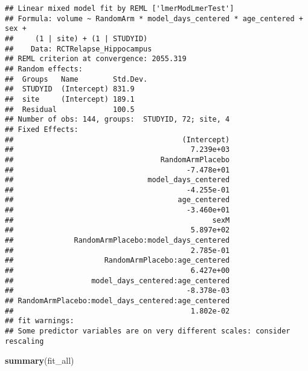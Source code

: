 \documentclass[]{article}
\newenvironment{Shaded}{\begin{snugshade}}{\end{snugshade}}
\newcommand{\KeywordTok}[1]{\textcolor[rgb]{0.13,0.29,0.53}{\textbf{#1}}}
\newcommand{\NormalTok}[1]{#1}
\theoremstyle{definition}
\theoremstyle{definition}
\theoremstyle{definition}
\theoremstyle{remark}
\begin{document}
\begin{verbatim}
## Linear mixed model fit by REML ['lmerModLmerTest']
## Formula: volume ~ RandomArm * model_days_centered * age_centered + sex +  
##     (1 | site) + (1 | STUDYID)
##    Data: RCTRelapse_Hippocampus
## REML criterion at convergence: 2055.319
## Random effects:
##  Groups   Name        Std.Dev.
##  STUDYID  (Intercept) 831.9   
##  site     (Intercept) 189.1   
##  Residual             100.5   
## Number of obs: 144, groups:  STUDYID, 72; site, 4
## Fixed Effects:
##                                       (Intercept)  
##                                         7.239e+03  
##                                  RandomArmPlacebo  
##                                        -7.478e+01  
##                               model_days_centered  
##                                        -4.255e-01  
##                                      age_centered  
##                                        -3.460e+01  
##                                              sexM  
##                                         5.897e+02  
##              RandomArmPlacebo:model_days_centered  
##                                         2.785e-01  
##                     RandomArmPlacebo:age_centered  
##                                         6.427e+00  
##                  model_days_centered:age_centered  
##                                        -8.378e-03  
## RandomArmPlacebo:model_days_centered:age_centered  
##                                         1.802e-02  
## fit warnings:
## Some predictor variables are on very different scales: consider rescaling
\end{verbatim}

\begin{Shaded}
\begin{Highlighting}[]
  \KeywordTok{summary}\NormalTok{(fit_all)  }
\end{Highlighting}
\end{Shaded}
\end{document}
